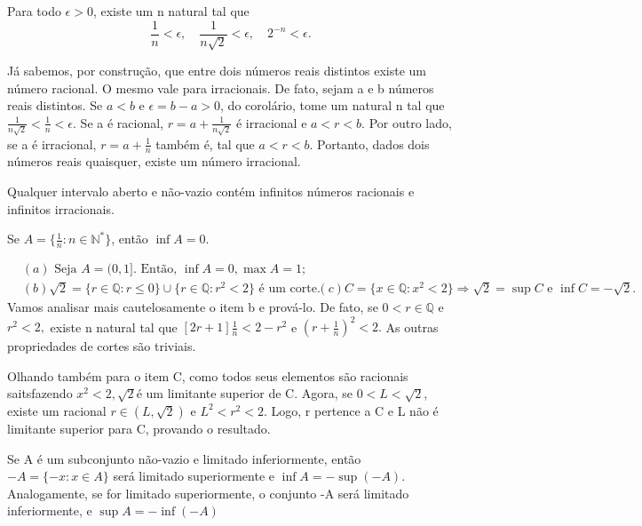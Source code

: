 \documentclass[Analysis/analysis_notes.tex]{subfiles}
\begin{document}
\begin{crl*}
	Para todo $\epsilon > 0$, existe um n natural tal que
	$$
		\frac{1}{n} < \epsilon, \quad \frac{1}{n\sqrt{2}}<\epsilon, \quad 2^{-n} < \epsilon.
	$$
\end{crl*}
J\'a sabemos, por constru\c c\~ao, que entre dois n\'umeros reais distintos existe um n\'umero racional. O mesmo vale para irracionais.
De fato, sejam a e b n\'umeros reais distintos. Se $a < b$ e $\epsilon = b - a > 0$, do corol\'ario, tome um natural n tal que
$\displaystyle \frac{1}{n\sqrt{2}} < \frac{1}{n} < \epsilon.$ Se a \'e racional, $r = \displaystyle a + \frac{1}{n\sqrt{2}}$ \'e irracional e
$a < r < b.$ Por outro lado, se a \'e irracional, $r =\displaystyle a + \frac{1}{n}$ tamb\'em \'e, tal que $a < r < b.$ Portanto,
dados dois n\'umeros reais quaisquer, existe um n\'umero irracional.
\begin{crl*}
	Qualquer intervalo aberto e n\~ao-vazio cont\'em infinitos n\'umeros racionais e infinitos irracionais.
\end{crl*}
\begin{crl*}
	Se $A = \biggr\{\displaystyle \frac{1}{n}: n\in \mathbb{N}^*\biggl\}$, ent\~ao $\inf A = 0.$
\end{crl*}
\begin{example}
	\begin{align*}
		 & (a) \text{ Seja }A = (0, 1]. \text{ Ent\~ao, } \inf{A} = 0, \max{A} = 1;                         \\
		 & (b) \sqrt{2} = \{r\in\mathbb{Q}: r \leq 0\}\cup \{r\in\mathbb{Q}: r^2 < 2\}\text{ \'e um corte.}
		 & (c) C = \{x\in\mathbb{Q}: x^2 < 2\} \Rightarrow \sqrt{2}=\sup{C}\text{ e }\inf{C} = -\sqrt{2}.
	\end{align*}
	Vamos analisar mais cautelosamente o item b e prov\'a-lo. De fato, se $0 < r\in \mathbb{Q}$ e $r^2 < 2,$ existe n natural tal que
	$[2r + 1]\frac{1}{n} < 2 - r^2$ e $(r + \frac{1}{n})^2 < 2.$ As outras propriedades de cortes s\~ao triviais.

	Olhando tamb\'em para o item C, como todos seus elementos s\~ao racionais saitsfazendo $x^2 < 2, \sqrt{2}$\'e um limitante superior de C.
	Agora, se $0 < L < \sqrt{2}$, existe um racional $r\in(L, \sqrt{2})$ e $L^2 < r^2 < 2.$ Logo, r pertence a C e L n\~ao \'e limitante superior para C,
	provando o resultado.
\end{example}
\begin{prop*}
	Se A \'e um subconjunto n\~ao-vazio e limitado inferiormente, ent\~ao $-A = \{-x: x\in A\}$ ser\'a limitado superiormente e
	$\inf{A} = -\sup{(-A)}$. Analogamente, se for limitado superiormente, o conjunto -A ser\'a limitado inferiormente, e $\sup{A}=-\inf{(-A)}$
\end{prop*}
\end{document}
